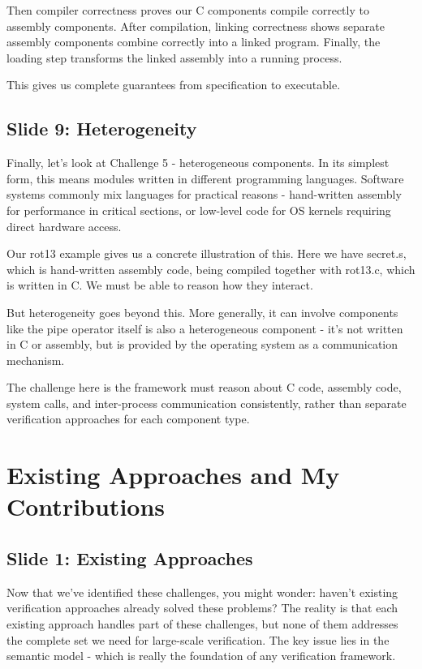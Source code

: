 \documentclass{article}
\begin{document}
Then compiler correctness proves our C components compile correctly to assembly
components. After compilation, linking correctness shows separate assembly
components combine correctly into a linked program. Finally, the loading step
transforms the linked assembly into a running process.

This gives us complete guarantees from specification to executable.

\subsection{Slide 9: Heterogeneity}

Finally, let's look at Challenge 5 - heterogeneous components. In its simplest
form, this means modules written in different programming languages. Software
systems commonly mix languages for practical reasons - hand-written assembly for
performance in critical sections, or low-level code for OS kernels requiring
direct hardware access.

Our rot13 example gives us a concrete illustration of this. Here we have
secret.s, which is hand-written assembly code, being compiled together with
rot13.c, which is written in C. We must be able to reason how they interact.

But heterogeneity goes beyond this. More generally, it can involve components
like the pipe operator itself is also a heterogeneous component - it's not
written in C or assembly, but is provided by the operating system as a
communication mechanism.

The challenge here is the framework must reason about C code, assembly code,
system calls, and inter-process communication consistently, rather than separate
verification approaches for each component type.

\section{Existing Approaches and My Contributions}

\subsection{Slide 1: Existing Approaches}

Now that we've identified these challenges, you might wonder: haven't existing
verification approaches already solved these problems? The reality is that each
existing approach handles part of these challenges, but none of them addresses
the complete set we need for large-scale verification. The key issue lies in the
semantic model - which is really the foundation of any verification framework.
\end{document}
